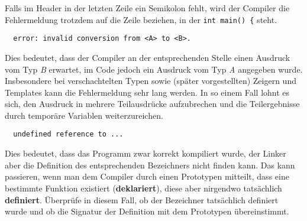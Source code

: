 
Falls im Header  in der letzten Zeile ein Semikolon fehlt, wird der Compiler die Fehlermeldung trotzdem auf die Zeile beziehen, in der \lstinline{int main() {} steht.

\begin{verbatim}
  error: invalid conversion from <A> to <B>.
\end{verbatim}

Dies bedeutet, dass der Compiler an der entsprechenden Stelle einen Ausdruck vom Typ \emph{B} erwartet, im Code jedoch ein Ausdruck vom Typ \emph{A} angegeben wurde. Insbesondere bei verschachtelten Typen sowie (später vorgestellten) Zeigern und Templates kann die Fehlermeldung sehr lang werden. In so einem Fall lohnt es sich, den Ausdruck in mehrere Teilausdrücke aufzubrechen und die Teilergebnisse durch temporäre Variablen weiterzureichen.

\begin{verbatim}
  undefined reference to ...
\end{verbatim}

Dies bedeutet, dass das Programm zwar korrekt kompiliert wurde, der Linker aber die Definition des entsprechenden Bezeichners nicht finden kann.
Das kann passieren, wenn man dem Compiler durch einen Prototypen mitteilt, dass eine bestimmte Funktion existiert (\textbf{deklariert}), diese aber nirgendwo tatsächlich \textbf{definiert}.
Überprüfe in diesem Fall, ob der Bezeichner tatsächlich definiert wurde und ob die Signatur der Definition mit dem Prototypen übereinstimmt.
